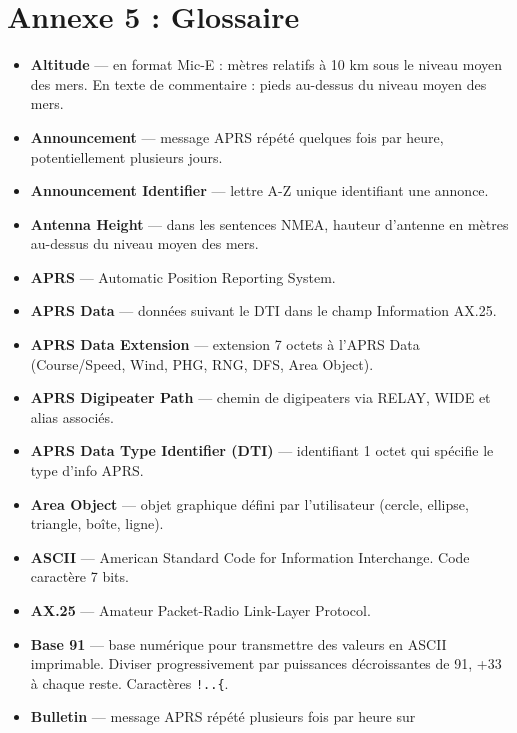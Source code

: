 \clearpage
\section*{Annexe 5 : Glossaire}\label{annexe-5-glossaire}

{\small
\begin{itemize}
\setlength{\itemsep}{0pt}
\setlength{\parsep}{0pt}
\setlength{\topsep}{2pt}
\tightlist
\item
  \textbf{Altitude} --- en format Mic-E : mètres relatifs à 10 km sous
  le niveau moyen des mers. En texte de commentaire : pieds au-dessus du
  niveau moyen des mers.
\item
  \textbf{Announcement} --- message APRS répété quelques fois par heure,
  potentiellement plusieurs jours.
\item
  \textbf{Announcement Identifier} --- lettre A-Z unique identifiant une
  annonce.
\item
  \textbf{Antenna Height} --- dans les sentences NMEA, hauteur d'antenne
  en mètres au-dessus du niveau moyen des mers.
\item
  \textbf{APRS} --- Automatic Position Reporting System.
\item
  \textbf{APRS Data} --- données suivant le DTI dans le champ
  Information AX.25.
\item
  \textbf{APRS Data Extension} --- extension 7 octets à l'APRS Data
  (Course/Speed, Wind, PHG, RNG, DFS, Area Object).
\item
  \textbf{APRS Digipeater Path} --- chemin de digipeaters via RELAY,
  WIDE et alias associés.
\item
  \textbf{APRS Data Type Identifier (DTI)} --- identifiant 1 octet qui
  spécifie le type d'info APRS.
\item
  \textbf{Area Object} --- objet graphique défini par l'utilisateur
  (cercle, ellipse, triangle, boîte, ligne).
\item
  \textbf{ASCII} --- American Standard Code for Information Interchange.
  Code caractère 7 bits.
\item
  \textbf{AX.25} --- Amateur Packet-Radio Link-Layer Protocol.
\item
  \textbf{Base 91} --- base numérique pour transmettre des valeurs en
  ASCII imprimable. Diviser progressivement par puissances décroissantes
  de 91, +33 à chaque reste. Caractères \texttt{!..\{}.
\item
  \textbf{Bulletin} --- message APRS répété plusieurs fois par heure sur

\end{itemize}}
